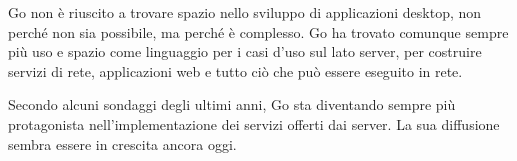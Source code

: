 Go non è riuscito a trovare spazio nello sviluppo di applicazioni desktop, non perché non sia possibile, ma perché è complesso.
Go ha trovato comunque sempre più uso e spazio come linguaggio per i casi d'uso sul lato server, per costruire servizi di rete, applicazioni web e tutto ciò che può essere eseguito in rete.

Secondo alcuni sondaggi degli ultimi anni, Go sta diventando sempre più protagonista nell'implementazione dei servizi offerti dai server.
La sua diffusione sembra essere in crescita ancora oggi.

